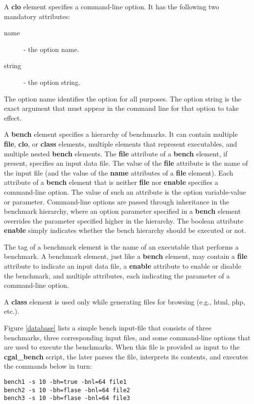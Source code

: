 A \textbf{clo} element specifies a command-line option. It has the
following two mandatory attributes:
\begin{description}
\item[name] - the option name.
\item[string] - the option string.
\end{description}

The option name identifies the option for all purposes. The option
string is the exact argument that must appear in the command line for
that option to take effect.

A \textbf{bench} element specifies a hierarchy of benchmarks. It can
contain multiple \textbf{file}, \textbf{clo}, or \textbf{class}
elements, multiple elements that represent executables, and multiple
nested \textbf{bench} elements. The \textbf{file} attribute of a
\textbf{bench} element, if present, specifies an input data file. The
value of the \textbf{file} attribute is the name of the input file
(and the value of the \textbf{name} attributes of a \textbf{file}
element). Each attribute of a \textbf{bench} element that is neither
\textbf{file} nor \textbf{enable} specifies a command-line option. The
value of such an attribute is the option variable-value or
parameter. Command-line options are passed through inheritance in the
benchmark hierarchy, where an option parameter specified in a
\textbf{bench} element overrides the parameter specified higher in the
hierarchy. The boolean attribute \textbf{enable} simply indicates
whether the bench hierarchy should be executed or not.

The tag of a benchmark element is the name of an executable that
performs a benchmark. A benchmark element, just like a \textbf{bench}
element, may contain a \textbf{file} attribute to indicate an input
data file, a \textbf{enable} attribute to enable or disable the
benchmark, and multiple attributes, each indicating the parameter of a
command-line option.

A \textbf{class} element is used only while generating files for
browsing (e.g., html, php, etc.). 

Figure \ref{database} lists a simple bench input-file that consists
of three benchmarks, three corresponding input files, and some
command-line options that are used to execute the benchmarks. When
this file is provided as input to the \textbf{cgal\_bench} script, the
later parses the file, interprets its contents, and executes the
commands below in turn:
\begin{verbatim}
bench1 -s 10 -bh=true -bnl=64 file1
bench2 -s 10 -bh=flase -bnl=64 file2
bench3 -s 10 -bh=flase -bnl=64 file3
\end{verbatim}

